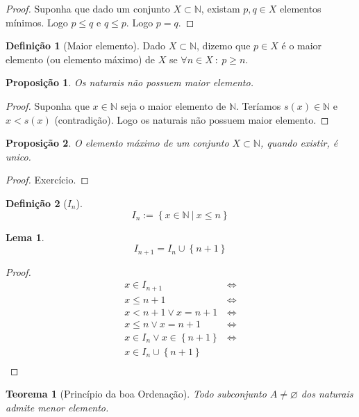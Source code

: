 \documentclass{article}
\newtheorem{prop}{Proposição}[section]
\theoremstyle{theorem}
\newtheorem{teo}{Teorema}
\theoremstyle{lemma}
\newtheorem{lema}{Lema}
\theoremstyle{definition}
\newtheorem{definicao}{Definição}[section]
\theoremstyle{remark}
\begin{document}
\begin{proof}
	Suponha que dado um conjunto $X\subset\mathbb{N}$,  existam $p,q\in X$ elementos mínimos. Logo $p\leq q $ e $q \leq p$. Logo $p=q$.
\end{proof}
\begin{definicao}[Maior elemento]
	Dado $X\subset \mathbb{N}$, dizemo que $p\in X$ é o maior elemento (ou elemento máximo) de $X$ se $\forall n\in X \: : \: p\geq n$.
\end{definicao}
\begin{prop}
	Os naturais não possuem maior elemento.
\end{prop}
\begin{proof}
	Suponha que $x\in \mathbb{N}$ seja o maior elemento de $\mathbb{N}$. Teríamos $s(x)\in \mathbb{N}$ e $x < s(x)$ (contradição). Logo os naturais não possuem maior elemento. 
\end{proof}
\begin{prop}
	O elemento máximo de um conjunto $X\subset \mathbb{N}$, quando existir, é unico.
\end{prop}
\begin{proof}
	Exercício.
\end{proof}
\begin{definicao}[$I_n$]
	$$I_n := \left\{ x\in \mathbb{N} \: | \:  x\leq n \right\}$$
\end{definicao}
\begin{lema}
	$$I_{n+1} = I_n \cup \left\{n+1\right\}$$
\end{lema}
\begin{proof}
	\begin{align*}
		x \in I_{n+1} &\iff \\
		x\leq n+1 &\iff \\
		x < n+1 \lor x = n+1 &\iff \\
		x \leq n \lor x = n+1 & \iff \\
		x\in I_n \lor x \in \left\{n+1\right\} & \iff \\
		x \in I_n \cup \left\{n+1\right\} \\
	\end{align*}
\end{proof}
\begin{teo}[Princípio da boa Ordenação]
	Todo subconjunto $A\neq \varnothing $ dos naturais admite menor elemento.
\end{teo}
\end{document}
